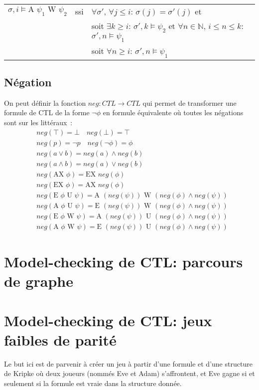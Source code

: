 \documentclass[10pt,a4paper]{article}
\begin{document}
\begin{tabular}{lcl}
$\sigma,i \vDash \mbox{A } \psi_1 \mbox{ W } \psi_2$ &ssi& $\forall \sigma'$, $\forall j \leq i$: $\sigma(j) = \sigma'(j)$ et\\
& & soit $\exists k \geq i$: $\sigma',k\vDash \psi_2$ et $\forall n \in \mathbb{N}$, $i \leq n \leq k$: $\sigma',n \vDash \psi_1$\\
& & soit $\forall n \geq i$: $\sigma',n \vDash \psi_1$\\
\end{tabular}


\subsection{Négation}
On peut définir la fonction $neg:CTL \to CTL$ qui permet de transformer une formule de CTL de la forme $\neg \phi$ en formule équivalente où toutes les négations sont sur les littéraux :
\begin{align*}
&neg(\top) = \bot \quad neg(\bot) = \top\\
&neg(p) = \neg p \quad neg(\neg \phi) = \phi\\
&neg(a \lor b) = neg(a) \land neg(b)\\
&neg(a \land b) = neg(a) \lor neg(b)\\
&neg(\mbox{AX } \phi) = \mbox{EX }neg(\phi)\\
&neg(\mbox{EX } \phi) = \mbox{AX }neg(\phi)\\
&neg(\mbox{E } \phi \mbox{ U } \psi) =\mbox{A } (neg(\psi)) \mbox{ W } (neg(\phi) \land neg(\psi))\\
&neg(\mbox{A } \phi \mbox{ U } \psi) =\mbox{E } (neg(\psi)) \mbox{ W } (neg(\phi) \land neg(\psi))\\
&neg(\mbox{E } \phi \mbox{ W } \psi) =\mbox{A } (neg(\psi)) \mbox{ U } (neg(\phi) \land neg(\psi))\\
&neg(\mbox{A } \phi \mbox{ W } \psi) =\mbox{E } (neg(\psi)) \mbox{ U } (neg(\phi) \land neg(\psi))
\end{align*}

\section{Model-checking de CTL: parcours de graphe}

\section{Model-checking de CTL: jeux faibles de parité}
Le but ici est de parvenir à créer un jeu à partir d'une formule et d'une structure de Kripke où deux joueurs (nommés Eve et Adam) s'affrontent, et Eve gagne si et seulement si la formule est vraie dans la structure donnée.
\end{document}
